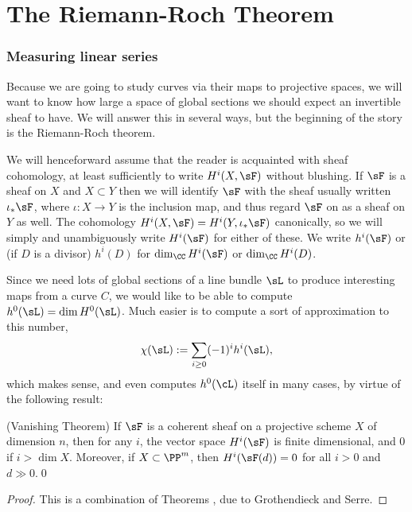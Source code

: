 

\chapter{The Riemann-Roch Theorem}\label{RiemannRochChapter}

\subsection{Measuring linear series}

Because we are going to study curves via their maps to projective spaces, we will want to know how large a space of global
sections we should expect an invertible sheaf to have. We will answer this in several ways, but the beginning
of the story is the Riemann-Roch theorem.

We will henceforward assume that the reader is acquainted with sheaf cohomology, at least sufficiently to write
$H^i(X, \sF)$ without blushing. If $\sF$ is a sheaf on $X$ and $X\subset Y$ then we will identify $\sF$ with
the sheaf usually written $\iota_*\sF$, where $\iota:X\to Y$ is the inclusion map,
 and thus regard $\sF$ on as a sheaf on $Y$ as well.
The cohomology  $H^i(X, \sF) = H^i(Y,\iota_*\sF)$ canonically, so we will
simply and unambiguously write $H^i(\sF)$ for either of these. 
We write $h^i(\sF)$ or (if $D$ is a divisor) $h^{i}(D)$ for $\dim_{\CC}H^i(\sF)$ or $\dim_{\CC}H^i(D)$. 

Since we need lots of global sections of a line bundle $\sL$ to produce interesting maps from a curve $C$, we would like to be able to compute  $h^0(\sL) = \dim H^0(\sL)$. Much easier is to compute a sort of approximation to this number,
$$
\chi(\sL):= \sum_{i\geq 0} (-1)^i h^i(\sL),
$$
which makes sense, and even computes $h^0(\cL)$ itself in many cases, by virtue of the following result:

\begin{theorem} (Vanishing Theorem)\label{Serre-Grothendieck vanishing}
If $\sF$ is a coherent sheaf on a projective scheme $X$ of dimension $n$, then for any $i$, the vector space $H^i(\sF)$ is finite dimensional, and 0 if  $i>\dim X$. Moreover,
if $X\subset \PP^m$, then $H^i(\sF(d)) = 0$ for all $i>0$ and $d\gg 0$.\qed
\end{theorem}


\begin{proof}
This is a combination of Theorems \cite[Theorems III.2.7 and III.5.2]{Hartshorne1977}, due to Grothendieck and Serre.
\end{proof}

